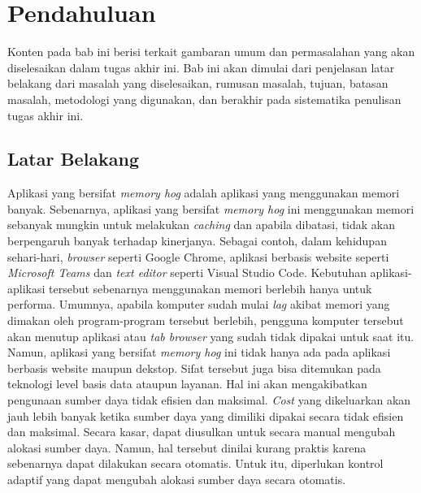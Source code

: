 \chapter{Pendahuluan}

Konten pada bab ini berisi terkait gambaran umum dan permasalahan yang akan diselesaikan dalam tugas akhir ini. Bab ini akan dimulai dari penjelasan latar belakang dari masalah yang diselesaikan, rumusan masalah, tujuan, batasan masalah, metodologi yang digunakan, dan berakhir pada sistematika penulisan tugas akhir ini.

\section{Latar Belakang}


Aplikasi yang bersifat \textit{memory hog} adalah aplikasi yang menggunakan memori banyak. Sebenarnya, aplikasi yang bersifat \textit{memory hog} ini menggunakan memori sebanyak mungkin untuk melakukan \textit{caching} dan apabila dibatasi, tidak akan berpengaruh banyak terhadap kinerjanya. Sebagai contoh, dalam kehidupan sehari-hari, \textit{browser} seperti Google Chrome, aplikasi berbasis website seperti \textit{Microsoft Teams} dan \textit{text editor} seperti Visual Studio Code. Kebutuhan aplikasi-aplikasi tersebut sebenarnya menggunakan memori berlebih hanya untuk performa. Umumnya, apabila komputer sudah mulai \textit{lag} akibat memori yang dimakan oleh program-program tersebut berlebih, pengguna komputer tersebut akan menutup aplikasi atau \textit{tab browser} yang sudah tidak dipakai untuk saat itu. Namun, aplikasi yang bersifat \textit{memory hog} ini tidak hanya ada pada aplikasi berbasis website maupun dekstop. Sifat tersebut juga bisa ditemukan pada teknologi level basis data ataupun layanan. Hal ini akan mengakibatkan pengunaan sumber daya tidak efisien dan maksimal. \textit{Cost} yang dikeluarkan akan jauh lebih banyak ketika sumber daya yang dimiliki dipakai secara tidak efisien dan maksimal. Secara kasar, dapat diusulkan untuk secara manual mengubah alokasi sumber daya. Namun, hal tersebut dinilai kurang praktis karena sebenarnya dapat dilakukan secara otomatis. Untuk itu, diperlukan kontrol adaptif yang dapat mengubah alokasi sumber daya secara otomatis.

